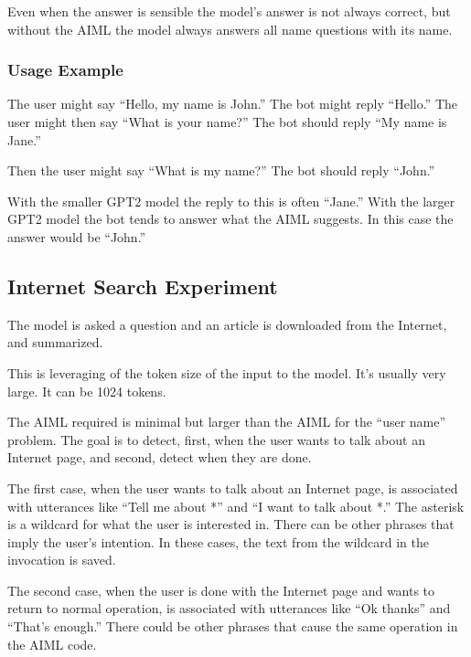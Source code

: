 Even when the answer is sensible the model's answer is not always correct, but without the AIML the model always answers all name questions with its name. 


\subsubsection{Usage Example}

The user might say ``Hello, my name is John.'' The bot might reply ``Hello.'' The user might then say ``What is your name?'' The bot should reply ``My name is Jane.''

Then the user might say ``What is my name?'' The bot should reply ``John.''

With the smaller GPT2 model the reply to this is often ``Jane.'' %
With the larger GPT2 model the bot tends to answer what the AIML suggests. In this case the answer would be ``John.''

\subsection{Internet Search Experiment}
The model is asked a question and an article is downloaded from the Internet, and summarized. %

This is leveraging of the token size of the input to the model. It's usually very large. It can be 1024 tokens.

The AIML required is minimal but larger than the AIML for the ``user name'' problem. The goal is to detect, first, when the user wants to talk about an Internet page, and second, detect when they are done.

The first case, when the user wants to talk about an Internet page, is associated with utterances like ``Tell me about *'' and ``I want to talk about *.'' The asterisk is a wildcard for what the user is interested in. There can be other phrases that imply the user's intention. In these cases, the text from the wildcard in the invocation is saved.

The second case, when the user is done with the Internet page and wants to return to normal operation, is associated with utterances like ``Ok thanks'' and ``That's enough.'' 
There could be other phrases that cause the same operation in the AIML code.

